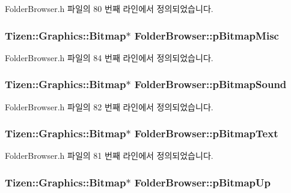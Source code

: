 Folder\+Browser.\+h 파일의 80 번째 라인에서 정의되었습니다.

\hypertarget{class_folder_browser_aa92204857b0b7a8d056ab74f5d9bc962}{
\subsubsection[{p\+Bitmap\+Misc}]{\setlength{\rightskip}{0pt plus 5cm}Tizen\+::\+Graphics\+::\+Bitmap$\ast$ Folder\+Browser\+::p\+Bitmap\+Misc\hspace{0.3cm}{\ttfamily [private]}}}\label{class_folder_browser_aa92204857b0b7a8d056ab74f5d9bc962}


Folder\+Browser.\+h 파일의 84 번째 라인에서 정의되었습니다.

\hypertarget{class_folder_browser_a375413fdf422f14ee9ea6ab055ffaebd}{
\subsubsection[{p\+Bitmap\+Sound}]{\setlength{\rightskip}{0pt plus 5cm}Tizen\+::\+Graphics\+::\+Bitmap$\ast$ Folder\+Browser\+::p\+Bitmap\+Sound\hspace{0.3cm}{\ttfamily [private]}}}\label{class_folder_browser_a375413fdf422f14ee9ea6ab055ffaebd}


Folder\+Browser.\+h 파일의 82 번째 라인에서 정의되었습니다.

\hypertarget{class_folder_browser_ac204936172a6e66bcf444e2cd9ff7ec4}{
\subsubsection[{p\+Bitmap\+Text}]{\setlength{\rightskip}{0pt plus 5cm}Tizen\+::\+Graphics\+::\+Bitmap$\ast$ Folder\+Browser\+::p\+Bitmap\+Text\hspace{0.3cm}{\ttfamily [private]}}}\label{class_folder_browser_ac204936172a6e66bcf444e2cd9ff7ec4}


Folder\+Browser.\+h 파일의 81 번째 라인에서 정의되었습니다.

\hypertarget{class_folder_browser_a7299cea38b070d659f6b2e35e4dbdd08}{
\subsubsection[{p\+Bitmap\+Up}]{\setlength{\rightskip}{0pt plus 5cm}Tizen\+::\+Graphics\+::\+Bitmap$\ast$ Folder\+Browser\+::p\+Bitmap\+Up\hspace{0.3cm}{\ttfamily [private]}}}\label{class_folder_browser_a7299cea38b070d659f6b2e35e4dbdd08}


